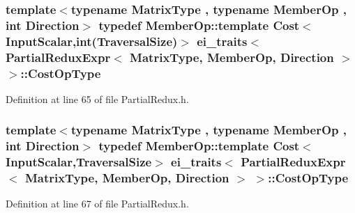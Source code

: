 \hypertarget{structei__traits_3_01_partial_redux_expr_3_01_matrix_type_00_01_member_op_00_01_direction_01_4_01_4_a741a0eacb4a72c3a935e08ad0a8e371d}{
\subsubsection[{Cost\-Op\-Type}]{\setlength{\rightskip}{0pt plus 5cm}template$<$typename Matrix\-Type , typename Member\-Op , int Direction$>$ typedef Member\-Op\-::template Cost$<${\bf Input\-Scalar},{\bf int}({\bf Traversal\-Size})$>$ {\bf ei\-\_\-traits}$<$ {\bf Partial\-Redux\-Expr}$<$ Matrix\-Type, Member\-Op, Direction $>$ $>$\-::{\bf Cost\-Op\-Type}}}\label{structei__traits_3_01_partial_redux_expr_3_01_matrix_type_00_01_member_op_00_01_direction_01_4_01_4_a741a0eacb4a72c3a935e08ad0a8e371d}


Definition at line 65 of file Partial\-Redux.\-h.

\hypertarget{structei__traits_3_01_partial_redux_expr_3_01_matrix_type_00_01_member_op_00_01_direction_01_4_01_4_aca9283e9f04a0eec6aab1ac88dc9bf25}{
\subsubsection[{Cost\-Op\-Type}]{\setlength{\rightskip}{0pt plus 5cm}template$<$typename Matrix\-Type , typename Member\-Op , int Direction$>$ typedef Member\-Op\-::template Cost$<${\bf Input\-Scalar},{\bf Traversal\-Size}$>$ {\bf ei\-\_\-traits}$<$ {\bf Partial\-Redux\-Expr}$<$ Matrix\-Type, Member\-Op, Direction $>$ $>$\-::{\bf Cost\-Op\-Type}}}\label{structei__traits_3_01_partial_redux_expr_3_01_matrix_type_00_01_member_op_00_01_direction_01_4_01_4_aca9283e9f04a0eec6aab1ac88dc9bf25}


Definition at line 67 of file Partial\-Redux.\-h.

